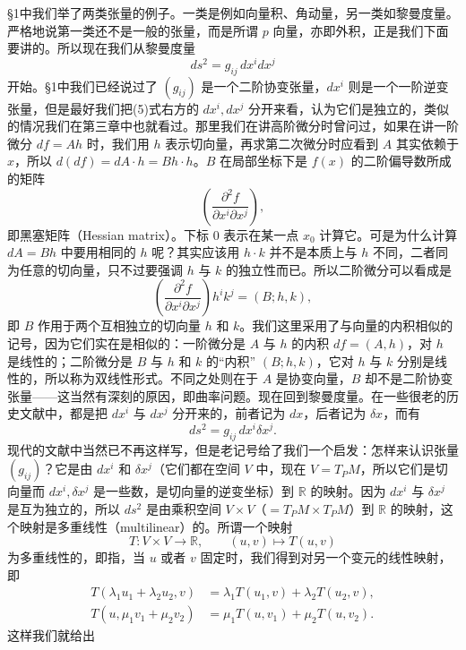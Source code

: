 §1中我们举了两类张量的例子。一类是例如向量积、角动量，另一类如黎曼度量。严格地说第一类还不是一般的张量，而是所谓 $p$ 向量，亦即外积，正是我们下面要讲的。所以现在我们从黎曼度量
\begin{equation}
 ds^2=g_{ij}\,dx^i dx^j
 \tag{5}
\end{equation}
开始。§1中我们已经说过了 $(g_{ij})$ 是一个二阶协变张量，$dx^i$ 则是一个一阶逆变张量，但是最好我们把(5)式右方的 $dx^i,dx^j$ 分开来看，认为它们是独立的，类似的情况我们在第三章中也就看过。那里我们在讲高阶微分时曾问过，如果在讲一阶微分 $df=Ah$ 时，我们用 $h$ 表示切向量，再求第二次微分时应看到 $A$ 其实依赖于 $x$，所以 $d(df)=dA\cdot h=Bh\cdot h$。$B$ 在局部坐标下是 $f(x)$ 的二阶偏导数所成的矩阵
\[
 \left(\frac{\partial^2f}{\partial x^i\partial x^j}\right),
\]
即黑塞矩阵（Hessian matrix）。下标 $0$ 表示在某一点 $x_0$ 计算它。可是为什么计算 $dA=Bh$ 中要用相同的 $h$ 呢？其实应该用 $h\cdot k$ 并不是本质上与 $h$ 不同，二者同为任意的切向量，只不过要强调 $h$ 与 $k$ 的独立性而已。所以二阶微分可以看成是
\begin{equation}
 \left(\frac{\partial^2f}{\partial x^i\partial x^j}\right)h^ik^j=(B;h,k),
 \tag{6}
\end{equation}
即 $B$ 作用于两个互相独立的切向量 $h$ 和 $k$。我们这里采用了与向量的内积相似的记号，因为它们实在是相似的：一阶微分是 $A$ 与 $h$ 的内积 $df=(A,h)$，对 $h$ 是线性的；二阶微分是 $B$ 与 $h$ 和 $k$ 的“内积” $(B;h,k)$，它对 $h$ 与 $k$ 分别是线性的，所以称为双线性形式。不同之处则在于 $A$ 是协变向量，$B$ 却不是二阶协变张量——这当然有深刻的原因，即曲率问题。现在回到黎曼度量。在一些很老的历史文献中，都是把 $dx^i$ 与 $dx^j$ 分开来的，前者记为 $dx$，后者记为 $\delta x$，而有
\[
 ds^2=g_{ij}\,dx^i\delta x^j.
\]
现代的文献中当然已不再这样写，但是老记号给了我们一个启发：怎样来认识张量 $(g_{ij})$？它是由 $dx^i$ 和 $\delta x^j$（它们都在空间 $V$ 中，现在 $V=T_PM$，所以它们是切向量而 $dx^i,\delta x^j$ 是一些数，是切向量的逆变坐标）到 $\mathbb R$ 的映射。因为 $dx^i$ 与 $\delta x^j$ 是互为独立的，所以 $ds^2$ 是由乘积空间 $V\times V$（$=T_PM\times T_PM$）到 $\mathbb R$ 的映射，这个映射是多重线性（multilinear）的。所谓一个映射
\[
 T:V\times V\longrightarrow\mathbb R,
 \qquad (u,v)\longmapsto T(u,v)
\]
为多重线性的，即指，当 $u$ 或者 $v$ 固定时，我们得到对另一个变元的线性映射，即
\begin{align}
 T(\lambda_1u_1+\lambda_2u_2,v)&=\lambda_1T(u_1,v)+\lambda_2T(u_2,v),\\
 T(u,\mu_1v_1+\mu_2v_2)&=\mu_1T(u,v_1)+\mu_2T(u,v_2).
 \tag{7}
\end{align}
这样我们就给出

